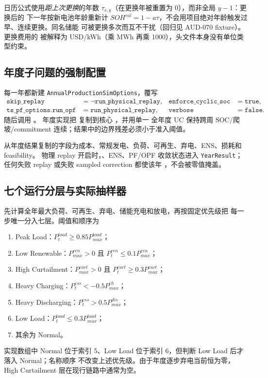 日历公式使用\emph{距上次更换}的年数 $\tau_{s,y}$（在更换年被重置为 0），而非全局 $y-1$：更换后的
下一年按新电池年龄重新计 $SOH^{cal}=1-a\tau$，不会用项目绝对年龄触发过早、连续更换。同名储能
可被更换多次而互不干扰（回归见 AUD-070 fixture）。更换费用的  被解释为
USD/kWh（乘 MWh 再乘 1000），头文件本身没有单位类型约束。

\subsection{年度子问题的强制配置}
每一年都新建 \texttt{AnnualProductionSimOptions}，覆写
\begin{align}
  \texttt{skip\_replay}&=\neg\texttt{run\_physical\_replay}, &
  \texttt{enforce\_cyclic\_soc}&=\texttt{true},\\
  \texttt{ts\_pf\_options.run\_opf}&=\texttt{run\_physical\_replay}, &
 \texttt{verbose}&=\texttt{false}.
\end{align}
随后调用 。
年度实现把  复制到核心 ，并用单一
全年度 UC 保持跨周 SOC/爬坡/commitment 连续；结果中的边界残差必须小于准入阈值。

从年度结果复制的字段为成本、常规发电、负荷、可再生、弃电、ENS、损耗和 feasibility。
物理 replay 开启时，、ENS、PF/OPF 收敛状态进入
\texttt{YearResult}；任何失败 replay 或失败 sampled correction 都使该年
，不会被零值掩盖。

\subsection{七个运行分层与实际抽样器}
 先计算全年最大负荷、可再生、弃电、储能充电和放电，再按固定优先级把
每一步唯一分入七层。阈值和顺序为
\begin{enumerate}
  \item Peak Load：$P^{load}_t\ge0.85P^{load}_{max}$；
  \item Low Renewable：$P^{ren}_{max}>0$ 且 $P^{ren}_t\le0.1P^{ren}_{max}$；
  \item High Curtailment：$P^{curt}_{max}>0$ 且 $P^{curt}_t\ge0.3P^{curt}_{max}$；
  \item Heavy Charging：$P^{ess}_t<-0.5P^{ch}_{max}$；
  \item Heavy Discharging：$P^{ess}_t>0.5P^{dis}_{max}$；
  \item Low Load：$P^{load}_t\le0.3P^{load}_{max}$；
  \item 其余为 Normal。
\end{enumerate}
实现数组中 Normal 位于索引 5、Low Load 位于索引 6，但判断 Low Load 后才落入 Normal；名称顺序
不改变上述优先级。由于年度逐步弃电当前恒为零，High Curtailment 层在现行链路中通常为空。

